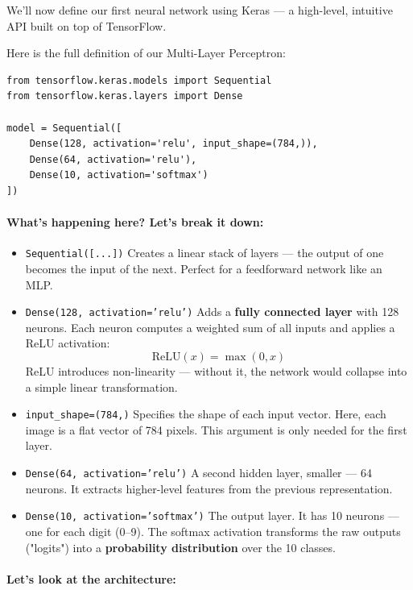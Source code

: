 \documentclass[11pt]{article}
\begin{document}
We’ll now define our first neural network using Keras — a high-level, intuitive API built on top of TensorFlow.

Here is the full definition of our Multi-Layer Perceptron:

\begin{verbatim}
from tensorflow.keras.models import Sequential
from tensorflow.keras.layers import Dense

model = Sequential([
    Dense(128, activation='relu', input_shape=(784,)),
    Dense(64, activation='relu'),
    Dense(10, activation='softmax')
])
\end{verbatim}

\paragraph{What’s happening here? Let’s break it down:}

\begin{itemize}
    \item \texttt{Sequential([...])}  
    Creates a linear stack of layers — the output of one becomes the input of the next. Perfect for a feedforward network like an MLP.
    
    \item \texttt{Dense(128, activation='relu')}  
    Adds a \textbf{fully connected layer} with 128 neurons. Each neuron computes a weighted sum of all inputs and applies a ReLU activation:
    \[
    \text{ReLU}(x) = \max(0, x)
    \]
    ReLU introduces non-linearity — without it, the network would collapse into a simple linear transformation.

    \item \texttt{input\_shape=(784,)}  
    Specifies the shape of each input vector. Here, each image is a flat vector of 784 pixels. This argument is only needed for the first layer.

    \item \texttt{Dense(64, activation='relu')}  
    A second hidden layer, smaller — 64 neurons. It extracts higher-level features from the previous representation.

    \item \texttt{Dense(10, activation='softmax')}  
    The output layer. It has 10 neurons — one for each digit (0–9).  
    The softmax activation transforms the raw outputs ("logits") into a \textbf{probability distribution} over the 10 classes.
\end{itemize}

\paragraph{Let’s look at the architecture:}
\end{document}
